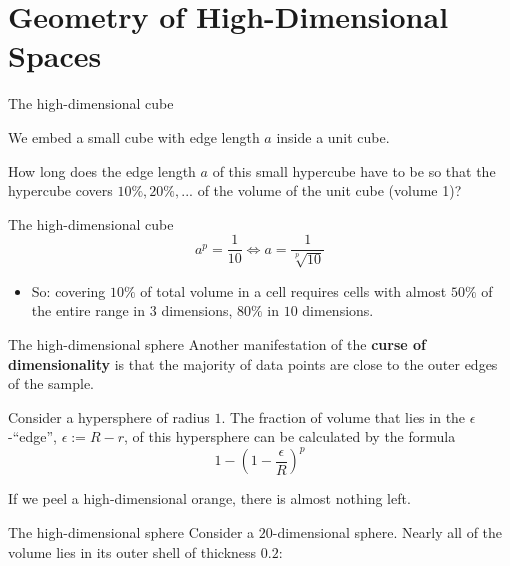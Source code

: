 \documentclass[11pt,compress,t,notes=noshow, xcolor=table]{beamer}
\begin{document}
\section{Geometry of High-Dimensional Spaces}

\begin{framei}{The high-dimensional cube}
\item We embed a small cube with edge length $a$ inside a unit cube.
\item How long does the edge length $a$ of this small hypercube have to be so that the hypercube covers $10\%, 20\%, ...$ of the volume of the unit cube (volume 1)?
\vfill
{}
\end{framei}

\begin{framev}{The high-dimensional cube}
$$a^p = \frac{1}{10} \Leftrightarrow a = \frac{1}{\sqrt[p]{10}}$$
\begin{itemize}
\item So: covering $10\%$ of total volume in a cell requires cells with almost $50\%$ of the entire range in $3$ dimensions, $80\%$ in $10$ dimensions.
\end{itemize}
\end{framev}

\begin{framev}{The high-dimensional sphere}
Another manifestation of the \textbf{curse of dimensionality} is that the majority of data points are close to the outer edges of the sample.

\vfill

Consider a hypersphere of radius $1$. The fraction of volume that lies in the $\epsilon$-\enquote{edge}, $\epsilon := R - r$, of this hypersphere can be calculated by the formula
$$
1 - (1 - \frac{\epsilon}{R})^p
$$


\vfill

If we peel a high-dimensional orange, there is almost nothing left.
\end{framev}

\begin{framev}{The high-dimensional sphere}
Consider a $20$-dimensional sphere. Nearly all of the volume lies in its outer shell of thickness $0.2$:

\vfill

\vfill
\end{framev}
\end{document}

